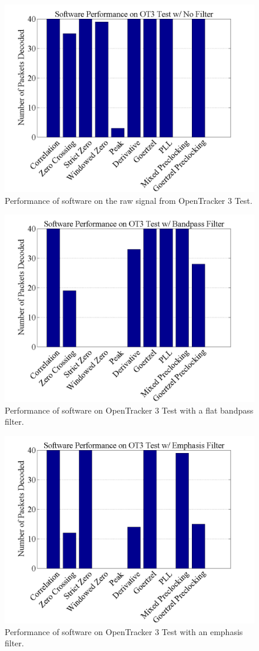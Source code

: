 \begin{figure}
  \centering
	\includegraphics[width=0.75\linewidth]{images/SoftwarePerformanceonOT3TestwNoFilter.png} 
	\caption{Performance of software on the raw signal from OpenTracker 3 Test.}
   \label{OT3FiltNo}
\end{figure}
\begin{figure}
  \centering
	\includegraphics[width=0.75\linewidth]{images/SoftwarePerformanceonOT3TestwBandpassFilter.png} 
	\caption{Performance of software on OpenTracker 3 Test with a flat bandpass filter.}
   \label{OT3Filt0}
\end{figure}
\begin{figure}
  \centering
	\includegraphics[width=0.75\linewidth]{images/SoftwarePerformanceonOT3TestwEmphasisFilter.png} 
	\caption{Performance of software on OpenTracker 3 Test with an emphasis filter.}
   \label{OT3Filt6}
\end{figure}
